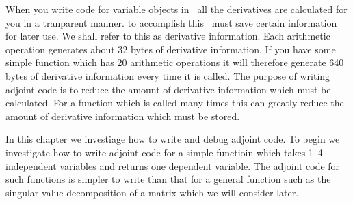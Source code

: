%
%

When you write code for variable objects in \ADM\ all the
derivatives are calculated for you in a tranparent manner. 
to accomplish this \ADM\ must save certain information for
later use. We shall refer to this as derivative information.
Each arithmetic operation generates about 32 bytes of
derivative information.  If you have some simple function which
has 20 arithmetic operations it will therefore
generate 640 bytes of derivative information every time
it is called. The purpose of writing adjoint code is to
reduce the amount of derivative information which must
be calculated. For a function which is called many times
this can greatly reduce the amount of derivative information which
must be stored.

In this chapter we investiage how to write and debug
adjoint code. To begin we investigate how to write adjoint code for a
simple functioin which takes 1--4 independent variables and returns
one dependent variable. The adjoint code for such functions is
simpler to write than that for a general function such as the
singular value decomposition of a matrix which we will consider later.


